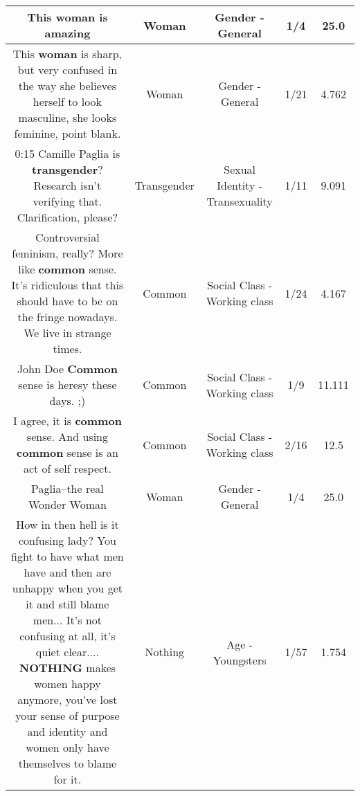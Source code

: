 \documentclass[11pt]{article}
\newlength\mylength
\begin{document}
\begin{center}
\begin{longtable}{|C{.65\mylength}|C{.30\mylength}|C{.12\mylength}|C{.12\mylength}|C{.12\mylength}|}
  \small This \textbf{woman} is amazing\normalsize   & Woman & Gender - General & 1/4 & 25.0 \\  \hline
  \small This \textbf{woman} is sharp, but very confused in the way she believes herself to look masculine, she looks feminine, point blank.\normalsize   & Woman & Gender - General & 1/21 & 4.762 \\  \hline
  \small 0:15 Camille Paglia is \textbf{transgender}? Research isn't verifying that. Clarification, please?\normalsize   & Transgender & Sexual Identity - Transexuality & 1/11 & 9.091 \\  \hline
  \small Controversial feminism, really? More like \textbf{common} sense. It's ridiculous that this should have to be on the fringe nowadays. We live in strange times.\normalsize   & Common & Social Class - Working class & 1/24 & 4.167 \\  \hline
  \small John Doe \textbf{Common} sense is heresy these days. ;)\normalsize   & Common & Social Class - Working class & 1/9 & 11.111 \\  \hline
  \small I agree, it is \textbf{common} sense. And using \textbf{common} sense is an act of self respect.\normalsize   & Common & Social Class - Working class & 2/16 & 12.5 \\  \hline
  \small Paglia--the real Wonder Woman\normalsize   & Woman & Gender - General & 1/4 & 25.0 \\  \hline
  \small How in then hell is it confusing lady? You fight to have what men have and then are unhappy when you get it and still blame men... It's not confusing at all, it's quiet clear.... \textbf{NOTHING} makes women happy anymore, you've lost your sense of purpose and identity and women only have themselves to blame for it.\normalsize   & Nothing & Age - Youngsters & 1/57 & 1.754 \\  \hline

\end{longtable}
\end{center}
\end{document}
